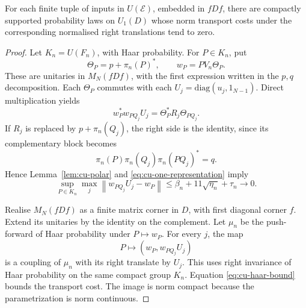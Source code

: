 \begin{proposition}\label{prop:cu-haar-law}
 For each finite tuple of inputs in $U(\mathcal{E})$,
embedded in $fDf$, there are compactly supported probability laws on $U_1(D)$
whose norm transport costs under the corresponding normalised right
translations tend to zero.
\end{proposition}

\begin{proof}
Let $K_n=U(F_n)$, with Haar probability. For $P\in K_n$, put 
\begin{equation*}
\Theta_P=p+\pi_n(P)^*,\qquad w_P=PV_n\Theta_P.
\end{equation*}
These are unitaries in $M_N(fDf)$, with the first expression written in the $p,q$ decomposition. Each $\Theta_P$ commutes with each $U_j=\mathrm{diag}(u_j,1_{N-1})$. Direct multiplication yields 
\begin{equation}  \label{eq:cu-relative}
w_P^*w_{PQ_j}U_j=\Theta_P^*R_j\Theta_{PQ_j}.
\end{equation}
If $R_j$ is replaced by $p+\pi_n(Q_j)$, the right side is the identity,
since its complementary block becomes 
\begin{equation*}
\pi_n(P)\pi_n(Q_j)\pi_n(PQ_j)^*=q.
\end{equation*}
Hence Lemma~\ref{lem:cu-polar} and \eqref{eq:cu-one-representation} imply 
\begin{equation}  \label{eq:cu-haar-bound}
\sup_{P\in K_n}\max_j\left\|w_{PQ_j}U_j-w_P\right\| \leq\beta_n+11\sqrt{\eta_n}+\tau_n\longrightarrow0.
\end{equation}

Realise $M_N(fDf)$ as a finite matrix corner in $D$, with first diagonal
corner $f$. Extend its unitaries by the identity on the complement. Let $\mu_n$ be the push-forward of Haar probability under $P\mapsto w_P$. For
every $j$, the map 
\begin{equation*}
P\longmapsto(w_P,w_{PQ_j}U_j)
\end{equation*}
is a coupling of $\mu_n$ with its right translate by $U_j$. This uses right
invariance of Haar probability on the same compact group $K_n$. Equation \eqref{eq:cu-haar-bound} bounds the transport cost. The image is norm compact
because the parametrization is norm continuous.
\end{proof}

